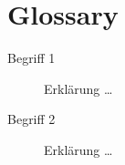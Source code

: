 \chapter*{Glossary}
\label{chap:glossary}

\begin{description}
    \item[Begriff 1] Erklärung … 
    \item[Begriff 2] Erklärung … 
\end{description}